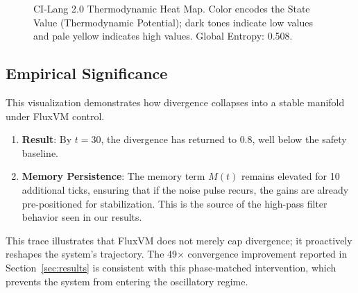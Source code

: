 \documentclass{article}
\begin{document}
\begin{figure}[h!]
\centering
{}
\caption{CI-Lang 2.0 Thermodynamic Heat Map. Color encodes the State Value
(Thermodynamic Potential); dark tones indicate low values and pale yellow indicates
high values. Global Entropy: 0.508.}
\label{fig:thermodynamic_heatmap}
\end{figure}

\subsection{Empirical Significance}

This visualization demonstrates how divergence collapses into a stable manifold
under FluxVM control.
\begin{enumerate}
    \item \textbf{Result}: By $t=30$, the divergence has returned to $0.8$, well
    below the safety baseline.
    \item \textbf{Memory Persistence}: The memory term $M(t)$ remains elevated for
    10 additional ticks, ensuring that if the noise pulse recurs, the gains are
    already pre-positioned for stabilization. This is the source of the
    high-pass filter behavior seen in our results.
\end{enumerate}

This trace illustrates that FluxVM does not merely cap divergence; it proactively
reshapes the system's trajectory. The 49$\times$ convergence improvement reported in
Section~\ref{sec:results} is consistent with this phase-matched intervention,
which prevents the system from entering the oscillatory regime.
\end{document}
